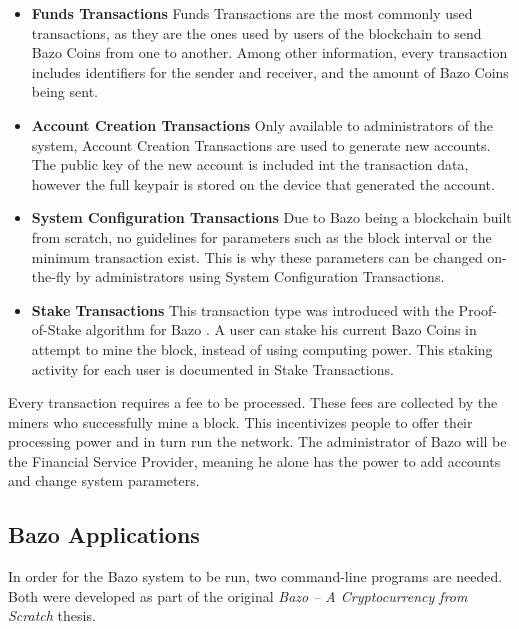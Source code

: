 \begin{itemize}
\item \textbf{Funds Transactions}
Funds Transactions are the most commonly used transactions, as they are the ones used by users of the blockchain to send Bazo Coins from one to another. Among other information, every transaction includes identifiers for the sender and receiver, and the amount of Bazo Coins being sent.
\item \textbf{Account Creation Transactions}
Only available to administrators of the system, Account Creation Transactions are used to generate new accounts. The public key of the new account is included int the transaction data, however the full keypair is stored on the device that generated the account.
\item \textbf{System Configuration Transactions}
Due to Bazo being a blockchain built from scratch, no guidelines for parameters such as the block interval or the minimum transaction exist. This is why these parameters can be changed on-the-fly by administrators using System Configuration Transactions.
\item \textbf{Stake Transactions}
This transaction type was introduced with the Proof-of-Stake algorithm for Bazo \cite{pos}. A user can stake his current Bazo Coins in attempt to mine the block, instead of using computing power. This staking activity for each user is documented in Stake Transactions.
\end{itemize}

Every transaction requires a fee to be processed. These fees are collected by the miners who successfully mine a block. This incentivizes people to offer their processing power and in turn run the network. The administrator of Bazo will be the Financial Service Provider, meaning he alone has the power to add accounts and change system parameters.

\subsection{Bazo Applications}
In order for the Bazo system to be run, two command-line programs are needed. Both were developed as part of the original \emph{Bazo -- A Cryptocurrency from Scratch} \cite{bazo} thesis.

